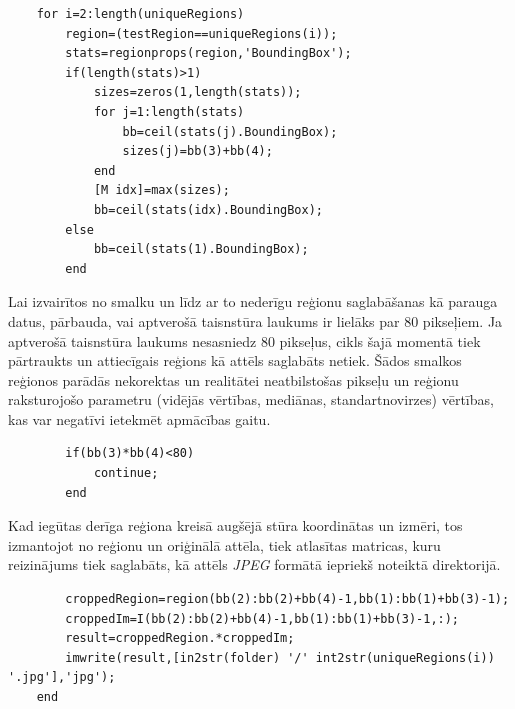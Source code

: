 \documentclass[12pt,paper=a4]{report}
\begin{document}
\begin{lstlisting}
    for i=2:length(uniqueRegions)
        region=(testRegion==uniqueRegions(i));
        stats=regionprops(region,'BoundingBox');
        if(length(stats)>1)
            sizes=zeros(1,length(stats));
            for j=1:length(stats)
                bb=ceil(stats(j).BoundingBox);
                sizes(j)=bb(3)+bb(4);
            end
            [M idx]=max(sizes);
            bb=ceil(stats(idx).BoundingBox);
        else
            bb=ceil(stats(1).BoundingBox);
        end
\end{lstlisting}\par
Lai izvairītos no smalku un līdz ar to nederīgu reģionu saglabāšanas kā parauga datus, pārbauda, vai aptverošā taisnstūra laukums ir lielāks par 80 pikseļiem. Ja aptverošā taisnstūra laukums nesasniedz 80 pikseļus, cikls šajā momentā tiek pārtraukts un attiecīgais reģions kā attēls saglabāts netiek. Šādos smalkos reģionos parādās nekorektas un realitātei neatbilstošas pikseļu un reģionu raksturojošo parametru (vidējās vērtības, mediānas, standartnovirzes) vērtības, kas var negatīvi ietekmēt apmācības gaitu.
\begin{lstlisting}
        if(bb(3)*bb(4)<80)
            continue;
        end
\end{lstlisting}\par
Kad iegūtas derīga reģiona kreisā augšējā stūra koordinātas un izmēri, tos izmantojot no reģionu un oriģinālā attēla, tiek atlasītas matricas, kuru reizinājums tiek saglabāts, kā attēls \textit{JPEG} formātā iepriekš noteiktā direktorijā.
\begin{lstlisting}
		croppedRegion=region(bb(2):bb(2)+bb(4)-1,bb(1):bb(1)+bb(3)-1);
        croppedIm=I(bb(2):bb(2)+bb(4)-1,bb(1):bb(1)+bb(3)-1,:);
        result=croppedRegion.*croppedIm;
        imwrite(result,[in2str(folder) '/' int2str(uniqueRegions(i)) '.jpg'],'jpg');
    end
\end{lstlisting}
\end{document}
